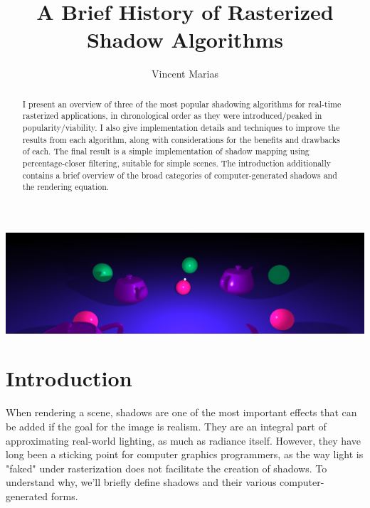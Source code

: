 \documentclass[acmsmall, screen, authorversion, nonacm]{acmart}
\begin{document}
\title{A Brief History of Rasterized Shadow Algorithms}

\author{Vincent Marias}

\begin{abstract}
  I present an overview of three of the most popular shadowing algorithms for real-time rasterized applications, in chronological order as they were introduced/peaked in popularity/viability. I also give implementation details and techniques to improve the results from each algorithm, along with considerations for the benefits and drawbacks of each. The final result is a simple implementation of shadow mapping using percentage-closer filtering, suitable for simple scenes. The introduction additionally contains a brief overview of the broad categories of computer-generated shadows and the rendering equation.
\end{abstract}

\begin{teaserfigure}
  \includegraphics[width=\textwidth]{images/teaser}
  \label{fig:teaser}
\end{teaserfigure}

\maketitle

\section{Introduction}

When rendering a scene, shadows are one of the most important effects that can be added if the goal for the image is realism. They are an integral part of approximating real-world lighting, as much as radiance itself. However, they have long been a sticking point for computer graphics programmers, as the way light is "faked" under rasterization does not facilitate the creation of shadows. To understand why, we'll briefly define shadows and their various computer-generated forms.
\end{document}
